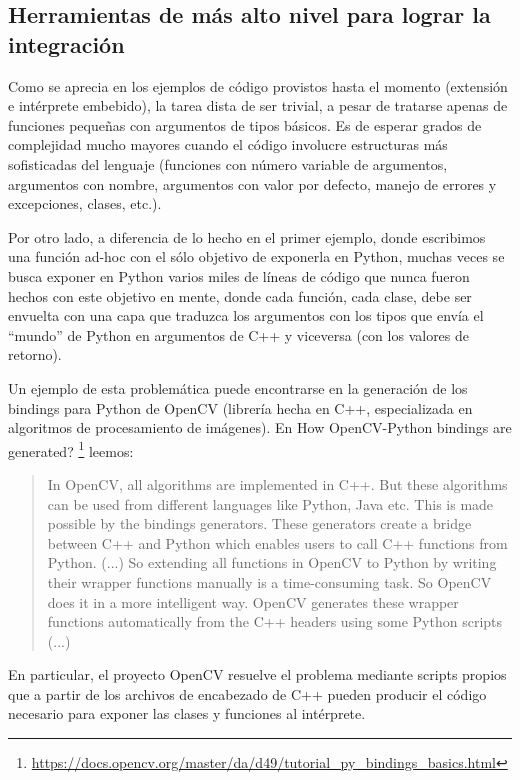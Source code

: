 \subsection{Herramientas de más alto nivel para lograr la integración}

Como se aprecia en los ejemplos de código provistos hasta el momento (extensión
e intérprete embebido), la tarea dista de ser trivial, a pesar de tratarse
apenas de funciones pequeñas con argumentos de tipos básicos. Es de esperar
grados de complejidad mucho mayores cuando el código involucre estructuras más
sofisticadas del lenguaje (funciones con número variable de argumentos,
argumentos con nombre, argumentos con valor por defecto, manejo de errores y
excepciones, clases, etc.).

Por otro lado, a diferencia de lo hecho en el primer ejemplo, donde escribimos
una función ad-hoc con el sólo objetivo de exponerla en Python, muchas veces se
busca exponer en Python varios miles de líneas de código que nunca fueron
hechos con este objetivo en mente, donde cada función, cada clase, debe ser
envuelta con una capa que traduzca los argumentos con los tipos que envía el
``mundo'' de Python en argumentos de C++ y viceversa (con los valores de
retorno).

Un ejemplo de esta problemática puede encontrarse en la generación de los
bindings para Python de OpenCV (librería hecha en C++, especializada en
algoritmos de procesamiento de imágenes). En How OpenCV-Python bindings are
generated?
\footnote{\url{https://docs.opencv.org/master/da/d49/tutorial_py_bindings_basics.html}}
leemos:

\begin{quotation}
In OpenCV, all algorithms are implemented in C++. But these algorithms can be
used from different languages like Python, Java etc. This is made possible by
the bindings generators. These generators create a bridge between C++ and
Python which enables users to call C++ functions from Python. (...)  So
extending all functions in OpenCV to Python by writing their wrapper functions
manually is a time-consuming task. So OpenCV does it in a more intelligent way.
OpenCV generates these wrapper functions automatically from the C++ headers
using some Python scripts (...)
\end{quotation}

En particular, el proyecto OpenCV resuelve el problema mediante scripts propios
que a partir de los archivos de encabezado de C++ pueden producir el código
necesario para exponer las clases y funciones al intérprete. 

